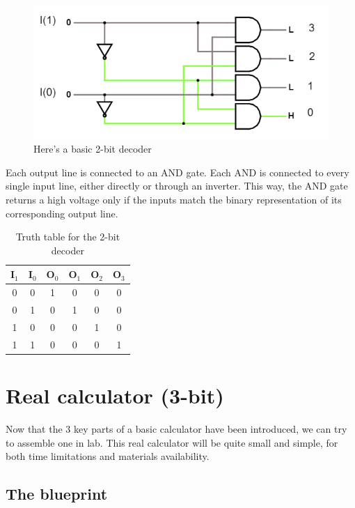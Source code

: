 \documentclass{article}
\begin{document}
\begin{figure}[h]
  \centering
  \includegraphics[scale=0.7]{basic_decoder}
  \caption{Here's a basic 2-bit decoder}
  \label{basic_decoder}
\end{figure}

Each output line is connected to an AND gate. Each AND is connected to every single input line, either directly or through an inverter. This way, the AND gate returns a high voltage only if the inputs match the binary representation of its corresponding output line.

\begin{table}[h]
  \centering
  \begin{tabular}{| c | c || c | c | c | c |}
  \hline
  I$_1$ & I$_0$ & O$_0$ & O$_1$ & O$_2$ & O$_3$ \\ \hline
  0 & 0 & 1 & 0 & 0 & 0 \\ \hline
  0 & 1 & 0 & 1 & 0 & 0 \\ \hline
  1 & 0 & 0 & 0 & 1 & 0 \\ \hline
  1 & 1 & 0 & 0 & 0 & 1 \\ \hline
  \end{tabular}
  \caption{Truth table for the 2-bit decoder}
  \label{Table_basic_decoder}
\end{table}

\clearpage

\section{Real calculator (3-bit)}

Now that the 3 key parts of a basic calculator have been introduced, we can try to assemble one in lab. This real calculator will be quite small and simple, for both time limitations and materials availability. 

\subsection{The blueprint}
\end{document}
